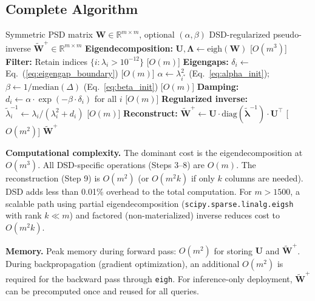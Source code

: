 \documentclass[journal]{IEEEtran}
\begin{document}
\subsection{Complete Algorithm}

\begin{algorithm}[!t]
\caption{Differential Spectral Damping (DSD)}
\label{alg:dsd}
\begin{algorithmic}[1]
\REQUIRE Symmetric PSD matrix $\bm{W} \in \mathbb{R}^{m \times m}$, optional $(\alpha, \beta)$
\ENSURE DSD-regularized pseudo-inverse $\tilde{\bm{W}}^+ \in \mathbb{R}^{m \times m}$
\STATE \textbf{Eigendecomposition:} $\bm{U}, \bm{\Lambda} \leftarrow \text{eigh}(\bm{W})$ \hfill [$O(m^3)$]
\STATE \textbf{Filter:} Retain indices $\{i : \lambda_i > 10^{-12}\}$ \hfill [$O(m)$]
\STATE \textbf{Eigengaps:} $\delta_i \leftarrow$ Eq.~(\ref{eq:eigengap_boundary}) \hfill [$O(m)$]
    \STATE $\alpha \leftarrow \lambda_{i^*}^2$ (Eq.~\ref{eq:alpha_init}); \quad $\beta \leftarrow 1/\text{median}(\Delta)$ (Eq.~\ref{eq:beta_init}) \hfill [$O(m)$]
\ENDIF
\STATE \textbf{Damping:} $d_i \leftarrow \alpha \cdot \exp(-\beta \cdot \delta_i)$ for all $i$ \hfill [$O(m)$]
\STATE \textbf{Regularized inverse:} $\tilde{\lambda}_i^{-1} \leftarrow \lambda_i / (\lambda_i^2 + d_i)$ \hfill [$O(m)$]
\STATE \textbf{Reconstruct:} $\tilde{\bm{W}}^+ \leftarrow \bm{U} \cdot \text{diag}(\tilde{\bm{\lambda}}^{-1}) \cdot \bm{U}^\top$ \hfill [$O(m^2)$]
\RETURN $\tilde{\bm{W}}^+$
\end{algorithmic}
\end{algorithm}

\textbf{Computational complexity.} The dominant cost is the eigendecomposition at $O(m^3)$. All DSD-specific operations (Steps 3--8) are $O(m)$. The reconstruction (Step 9) is $O(m^2)$ (or $O(m^2 k)$ if only $k$ columns are needed). DSD adds less than 0.01\% overhead to the total computation. For $m > 1500$, a scalable path using partial eigendecomposition (\texttt{scipy.sparse.linalg.eigsh} with rank $k \ll m$) and factored (non-materialized) inverse reduces cost to $O(m^2 k)$.

\textbf{Memory.} Peak memory during forward pass: $O(m^2)$ for storing $\bm{U}$ and $\tilde{\bm{W}}^+$. During backpropagation (gradient optimization), an additional $O(m^2)$ is required for the backward pass through \texttt{eigh}. For inference-only deployment, $\tilde{\bm{W}}^+$ can be precomputed once and reused for all queries.


\end{document}
